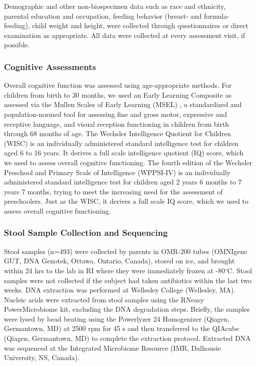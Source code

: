 \documentclass{article}
\begin{document}
Demographic and other non-biospecimen data such as race and ethnicity,
parental education and occupation, feeding behavior (breast- and
formula-feeding), child weight and height, were collected through
questionnaires or direct examination as appropriate. All data were
collected at every assessment visit, if possible.

\subsubsection*{Cognitive Assessments}

Overall cognitive function was assessed using age-appropriate methods.
For children from birth to 30 months, we used an Early Learning
Composite as assessed via the Mullen Scales of Early Learning (MSEL)
\cite{mullenMullenScalesEarly1995},
 a standardized and population-normed tool for assessing fine and
gross motor, expressive and receptive language, and visual reception
functioning in children from birth through 68 months of age. The
Wechsler Intelligence Quotient for Children (WISC)
\cite{wechslerWechslerPreschoolPrimary2012}
is an individually administered standard intelligence test for children
aged 6 to 16 years. It derives a full scale intelligence quotient (IQ)
score, which we used to assess overall cognitive functioning. The fourth
edition of the Wechsler Preschool and Primary Scale of Intelligence
(WPPSI-IV) is an individually administered standard intelligence test
for children aged 2 years 6 months to 7 years 7 months, trying to meet
the increasing need for the assessment of preschoolers. Just as the
WISC, it derives a full scale IQ score, which we used to assess overall
cognitive functioning.

\subsubsection*{Stool Sample Collection and Sequencing}

Stool samples (n=493) were collected by parents in OMR-200 tubes
(OMNIgene GUT, DNA Genotek, Ottawa, Ontario, Canada), stored on ice, and
brought within 24 hrs to the lab in RI where they were immediately
frozen at -80$^{\circ}$C. Stool samples were not collected if the subject had
taken antibiotics within the last two weeks. DNA extraction was
performed at Wellesley College (Wellesley, MA). Nucleic acids were
extracted from stool samples using the RNeasy PowerMicrobiome kit,
excluding the DNA degradation steps. Briefly, the samples were lysed by
bead beating using the Powerlyzer 24 Homogenizer (Qiagen, Germantown,
MD) at 2500 rpm for 45 s and then transferred to the QIAcube (Qiagen,
Germantown, MD) to complete the extraction protocol. Extracted DNA was
sequenced at the Integrated Microbiome Resource (IMR, Dalhousie
University, NS, Canada).
\end{document}
